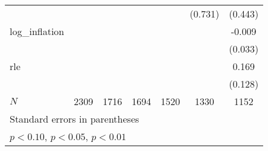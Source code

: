 {\begin{tabular}{l*{6}{c}}
            &                     &                     &                     &                     &     (0.731)         &     (0.443)         \\
\addlinespace
log\_inflation&                     &                     &                     &                     &                     &      -0.009         \\
            &                     &                     &                     &                     &                     &     (0.033)         \\
\addlinespace
rle         &                     &                     &                     &                     &                     &       0.169         \\
            &                     &                     &                     &                     &                     &     (0.128)         \\
\midrule
\(N\)       &        2309         &        1716         &        1694         &        1520         &        1330         &        1152         \\
\bottomrule
\multicolumn{7}{l}{\footnotesize Standard errors in parentheses}\\
\multicolumn{7}{l}{\footnotesize \sym{*} \(p<0.10\), \sym{**} \(p<0.05\), \sym{***} \(p<0.01\)}\\
\end{tabular}
}
